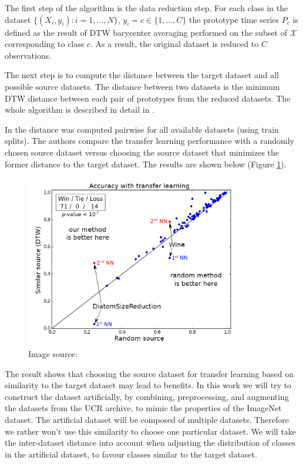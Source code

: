 \documentclass[a4paper,11pt,twoside]{report}
\theoremstyle{definition}
\begin{document}
The first step of the algorithm is the data reduction step. For each class in the dataset $\{(X_i, y_i): i=1, \dots , N\}$, $y_i=c \in \{ 1, \dots, C\}$ the prototype time series $P_c$ is defined as the result of DTW barycenter averaging performed on the subset of $\mathcal{X}$ corresponding to class $c$. As a result, the original dataset is reduced to $C$ observations.


The next step is to compute the distance between the target dataset and all possible source datasets. The distance between two datasets is the minimum DTW distance between each pair of prototypes from the reduced datasets. The whole algorithm is described in detail in \cite{transfer_learning_time_series}.

In \cite{transfer_learning_time_series} the distance was computed pairwise for all available datasets (using train splits). The authors compare the transfer learning performance with a randomly chosen source dataset versus choosing the source dataset that minimizes the former distance to the target dataset. The results are shown below (Figure \ref{fig:smart_transfer_learning}).
\FloatBarrier


\begin{figure}[h!]
\centering
\includegraphics[width=10cm]{imgs/smart_transfer_learning.png}
\caption{Image source: \cite{transfer_learning_time_series}}
\label{fig:smart_transfer_learning}
\end{figure}
\FloatBarrier

The result shows that choosing the source dataset for transfer learning based on similarity to the target dataset may lead to benefits. In this work we will try to construct the dataset artificially, by combining, preprocessing, and augmenting the datasets from the UCR archive, to mimic the properties of the ImageNet dataset. The artificial dataset will be composed of multiple datasets. Therefore we rather won't use this similarity to choose one particular dataset. We will take the inter-dataset distance into account when adjusting the distribution of classes in the artificial dataset, to favour classes similar to the target dataset.
\end{document}
